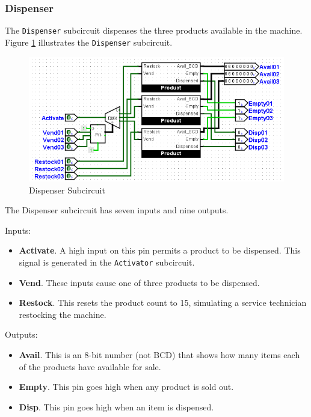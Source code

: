 \subsubsection{Dispenser}

The \lstinline[columns=fixed]|Dispenser| subcircuit dispenses the three products available in the machine. Figure \ref{fig:05-04} illustrates the \lstinline[columns=fixed]|Dispenser| subcircuit.

\begin{figure}[H]
	\centering
	\includegraphics[width=\maxwidth{.95\linewidth}]{gfx/05-04}
	\caption{Dispenser Subcircuit}
	\label{fig:05-04}
\end{figure}

The Dispenser subcircuit has seven inputs and nine outputs.

Inputs:

\begin{itemize}
	\item \textbf{Activate}. A high input on this pin permits a product to be dispensed. This signal is generated in the \lstinline[columns=fixed]|Activator| subcircuit.
	\item \textbf{Vend}. These inputs cause one of three products to be dispensed.
	\item \textbf{Restock}. This resets the product count to 15, simulating a service technician restocking the machine.
\end{itemize}

Outputs:

\begin{itemize}
	\item \textbf{Avail}. This is an 8-bit number (not \ac{BCD}) that shows how many items each of the products have available for sale.
	\item \textbf{Empty}. This pin goes high when any product is sold out.
	\item \textbf{Disp}. This pin goes high when an item is dispensed.
\end{itemize}

